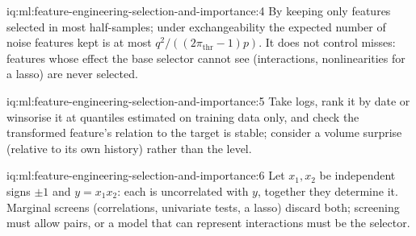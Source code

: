 \begin{solution}{iq:ml:feature-engineering-selection-and-importance:4}
By keeping only features selected in most half-samples; under exchangeability the expected number of noise features kept
is at most $q^2/((2\pi_{\mathrm{thr}} - 1)p)$. It does not control misses: features whose effect the base selector cannot
see (interactions, nonlinearities for a lasso) are never selected.
\end{solution}

\begin{solution}{iq:ml:feature-engineering-selection-and-importance:5}
Take logs, rank it by date or winsorise it at quantiles estimated on training data only, and check the transformed
feature's relation to the target is stable; consider a volume surprise (relative to its own history) rather than the
level.
\end{solution}

\begin{solution}{iq:ml:feature-engineering-selection-and-importance:6}
Let $x_1, x_2$ be independent signs $\pm1$ and $y = x_1x_2$: each is uncorrelated with $y$, together they determine it.
Marginal screens (correlations, univariate tests, a lasso) discard both; screening must allow pairs, or a model that
can represent interactions must be the selector.
\end{solution}
